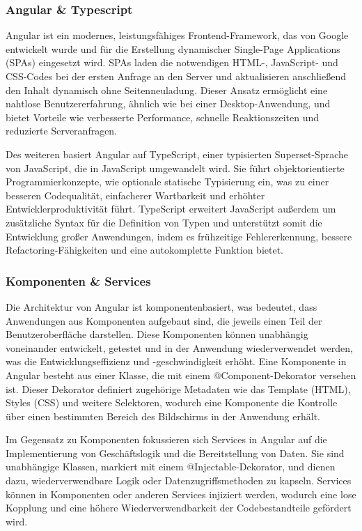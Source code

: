 \documentclass[../main.tex]{subfiles} %
\begin{document}
\subsubsection{Angular & Typescript}

Angular ist ein modernes, leistungsfähiges Frontend-Framework, das von Google entwickelt wurde und für die Erstellung dynamischer Single-Page 
Applications (SPAs) eingesetzt wird. SPAs laden die notwendigen HTML-, JavaScript- und CSS-Codes bei der ersten Anfrage an den Server und 
aktualisieren anschließend den Inhalt dynamisch ohne Seitenneuladung. Dieser Ansatz ermöglicht eine nahtlose Benutzererfahrung, ähnlich wie bei 
einer Desktop-Anwendung, und bietet Vorteile wie verbesserte Performance, schnelle Reaktionszeiten und reduzierte Serveranfragen.

Des weiteren basiert Angular auf TypeScript, einer typisierten Superset-Sprache von JavaScript, die in JavaScript umgewandelt wird. Sie führt 
objektorientierte Programmierkonzepte, wie optionale statische Typisierung ein, was zu einer besseren Codequalität, einfacherer Wartbarkeit und 
erhöhter Entwicklerproduktivität führt. TypeScript erweitert JavaScript außerdem um zusätzliche Syntax für die Definition von Typen und unterstützt 
somit die Entwicklung großer Anwendungen, indem es frühzeitige Fehlererkennung, bessere Refactoring-Fähigkeiten und eine autokomplette Funktion bietet.

\subsubsection{Komponenten \& Services}

Die Architektur von Angular ist komponentenbasiert, was bedeutet, dass Anwendungen aus Komponenten aufgebaut sind, die
jeweils einen Teil der Benutzeroberfläche darstellen. Diese Komponenten können unabhängig voneinander entwickelt, getestet und in der
Anwendung wiederverwendet werden, was die Entwicklungseffizienz und -geschwindigkeit erhöht. Eine Komponente in Angular besteht aus einer 
Klasse, die mit einem @Component-Dekorator versehen ist. Dieser Dekorator definiert zugehörige Metadaten wie das Template (HTML), Styles (CSS) 
und weitere Selektoren, wodurch eine Komponente die Kontrolle über einen bestimmten Bereich des Bildschirms in der Anwendung erhält.

Im Gegensatz zu Komponenten fokussieren sich Services in Angular auf die Implementierung von Geschäftslogik und die Bereitstellung von Daten. 
Sie sind unabhängige Klassen, markiert mit einem @Injectable-Dekorator, und dienen dazu, wiederverwendbare Logik oder Datenzugriffsmethoden zu 
kapseln. Services können in Komponenten oder anderen Services injiziert werden, wodurch eine lose Kopplung und eine höhere Wiederverwendbarkeit 
der Codebestandteile gefördert wird.
\end{document}
